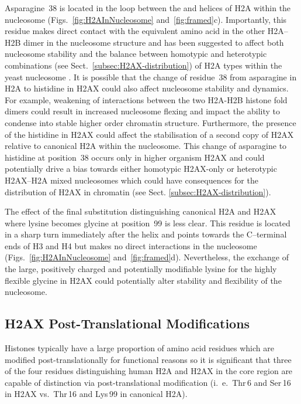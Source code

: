 \documentclass[graybox]{svmult}
\begin{document}
Asparagine~38 is located in the loop between the  and  helices of H2A within the
nucleosome (Figs.~\ref{fig:H2AInNucleosome} and~\ref{fig:framed}c). Importantly, this residue makes
direct contact with the equivalent amino acid in the other H2A--H2B dimer in the nucleosome structure
and has been suggested to affect both nucleosome stability and the balance between homotypic and
heterotypic combinations (see Sect.\ \ref{subsec:H2AX-distribution}) of H2A types within the yeast
nucleosome \cite{CLW01}. It is possible that the change of residue~38 from asparagine in H2A to
histidine in H2AX could also affect nucleosome stability and dynamics. For example, weakening of
interactions between the two H2A-H2B histone fold dimers could result in increased nucleosome
flexing and impact the ability to condense into stable higher order chromatin structure. Furthermore,
the presence of the histidine in H2AX could affect the stabilisation of a second copy of H2AX
relative to canonical H2A within the nucleosome. This change of asparagine to histidine at
position~38 occurs only in higher organism H2AX and could potentially drive a bias towards either
homotypic H2AX-only or heterotypic H2AX--H2A mixed nucleosomes which could have consequences for the
distribution of H2AX in chromatin (see Sect. \ref{subsec:H2AX-distribution}).

The effect of the final substitution distinguishing canonical H2A and H2AX where lysine becomes
glycine at position~99 is less clear. This residue is located in a sharp turn immediately after
the  helix and points towards the C--terminal ends of H3 and H4 but makes no direct
interactions in the nucleosome (Figs.~\ref{fig:H2AInNucleosome} and~\ref{fig:framed}d). Nevertheless,
the exchange of the large, positively charged and potentially modifiable lysine for the highly
flexible glycine in H2AX could potentially alter stability and flexibility of the nucleosome.

\subsection{H2AX Post-Translational Modifications}
\label{subsec:H2AX-PTM}
Histones typically have a large proportion of amino acid residues which are modified post-translationally
for functional reasons so it is significant that three of the four residues distinguishing human H2A
and H2AX in the core region are capable of distinction via post-translational modification
(i.~e.\ Thr\,6 and Ser\,16 in H2AX vs.\ Thr\,16 and Lys\,99 in canonical H2A).
\end{document}
